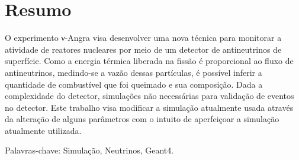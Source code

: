 %
%
\chapter*{Resumo}
\vspace{-2cm}

\noindent 
\vspace{0.5cm}

O experimento ν-Angra visa desenvolver uma nova técnica para monitorar a atividade de reatores nucleares por meio de um detector de antineutrinos de superfície. Como a energia térmica liberada na fissão é proporcional ao fluxo de antineutrinos, medindo-se a vazão dessas partículas, é possível inferir a quantidade de combustível que foi queimado e sua composição. Dada a complexidade do detector, simulações não necessárias para validação de eventos no detector. Este trabalho visa modificar a simulação atualmente usada através da alteração de alguns parâmetros com o intuito de aperfeiçoar a simulação atualmente utilizada.

\noindent Palavras-chave:  Simulação, Neutrinos, Geant4.\\

\newpage


